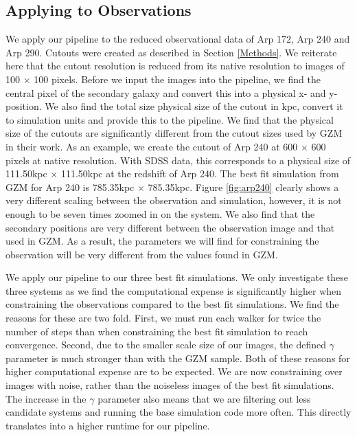\subsection{Applying to Observations}
\noindent We apply our pipeline to the reduced observational data of Arp 172, Arp 240 and Arp 290. Cutouts were created as described in Section \ref{Methods}. We reiterate here that the cutout resolution is reduced from its native resolution to images of 100 $\times$ 100 pixels. Before we input the images into the pipeline, we find the central pixel of the secondary galaxy and convert this into a physical x- and y-position. We also find the total size physical size of the cutout in kpc, convert it to simulation units and provide this to the pipeline. We find that the physical size of the cutouts are significantly different from the cutout sizes used by GZM in their work. As an example, we create the cutout of Arp 240 at 600 $\times$ 600 pixels at native resolution. With SDSS data, this corresponds to a physical size of 111.50kpc $\times$ 111.50kpc at the redshift of Arp 240. The best fit simulation from GZM for Arp 240 is 785.35kpc $\times$ 785.35kpc. Figure \ref{fig:arp240} clearly shows a very different scaling between the observation and simulation, however, it is not enough to be seven times zoomed in on the system. We also find that the secondary positions are very different between the observation image and that used in GZM. As a result, the parameters we will find for constraining the observation will be very different from the values found in GZM. 

We apply our pipeline to our three best fit simulations. We only investigate these three systems as we find the computational expense is significantly higher when constraining the observations compared to the best fit simulations. We find the reasons for these are two fold. First, we must run each walker for twice the number of steps than when constraining the best fit simulation to reach convergence. Second, due to the smaller scale size of our images, the defined $\gamma$ parameter is much stronger than with the GZM sample. Both of these reasons for higher computational expense are to be expected. We are now constraining over images with noise, rather than the noiseless images of the best fit simulations. The increase in the $\gamma$ parameter also means that we are filtering out less candidate systems and running the base simulation code more often. This directly translates into a higher runtime for our pipeline.

